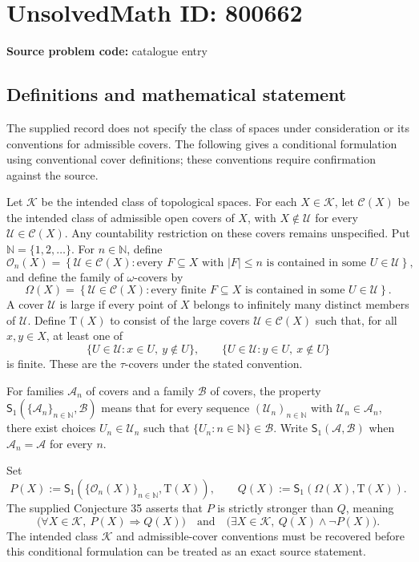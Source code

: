 \documentclass[11pt]{article}
\newcommand{\N}{\mathbb{N}}
\begin{document}
\section*{UnsolvedMath ID: 800662}
\textbf{Source problem code:} catalogue entry
\subsection{Definitions and mathematical statement}
The supplied record does not specify the class of spaces under consideration or its conventions for admissible covers. The following gives a conditional formulation using conventional cover definitions; these conventions require confirmation against the source.

Let \(\mathscr K\) be the intended class of topological spaces. For each \(X\in\mathscr K\), let \(\mathcal C(X)\) be the intended class of admissible open covers of \(X\), with \(X\notin\mathcal U\) for every \(\mathcal U\in\mathcal C(X)\). Any countability restriction on these covers remains unspecified. Put \(\N=\{1,2,\ldots\}\). For \(n\in\N\), define
\[
\mathcal O_n(X)=\left\{\mathcal U\in\mathcal C(X):\text{every }F\subseteq X\text{ with }|F|\le n\text{ is contained in some }U\in\mathcal U\right\},
\]
and define the family of \(\omega\)-covers by
\[
\Omega(X)=\left\{\mathcal U\in\mathcal C(X):\text{every finite }F\subseteq X\text{ is contained in some }U\in\mathcal U\right\}.
\]
A cover \(\mathcal U\) is large if every point of \(X\) belongs to infinitely many distinct members of \(\mathcal U\). Define \(\mathrm T(X)\) to consist of the large covers \(\mathcal U\in\mathcal C(X)\) such that, for all \(x,y\in X\), at least one of
\[
\{U\in\mathcal U:x\in U,\ y\notin U\},\qquad
\{U\in\mathcal U:y\in U,\ x\notin U\}
\]
is finite. These are the \(\tau\)-covers under the stated convention.

For families \(\mathcal A_n\) of covers and a family \(\mathcal B\) of covers, the property \(\mathsf S_1(\{\mathcal A_n\}_{n\in\N},\mathcal B)\) means that for every sequence \((\mathcal U_n)_{n\in\N}\) with \(\mathcal U_n\in\mathcal A_n\), there exist choices \(U_n\in\mathcal U_n\) such that \(\{U_n:n\in\N\}\in\mathcal B\). Write \(\mathsf S_1(\mathcal A,\mathcal B)\) when \(\mathcal A_n=\mathcal A\) for every \(n\).

Set
\[
P(X):=\mathsf S_1(\{\mathcal O_n(X)\}_{n\in\N},\mathrm T(X)),\qquad
Q(X):=\mathsf S_1(\Omega(X),\mathrm T(X)).
\]
The supplied Conjecture 35 asserts that \(P\) is strictly stronger than \(Q\), meaning
\[
\bigl(\forall X\in\mathscr K,\ P(X)\Longrightarrow Q(X)\bigr)
\quad\text{and}\quad
\bigl(\exists X\in\mathscr K,\ Q(X)\land\neg P(X)\bigr).
\]
The intended class \(\mathscr K\) and admissible-cover conventions must be recovered before this conditional formulation can be treated as an exact source statement.
\end{document}
